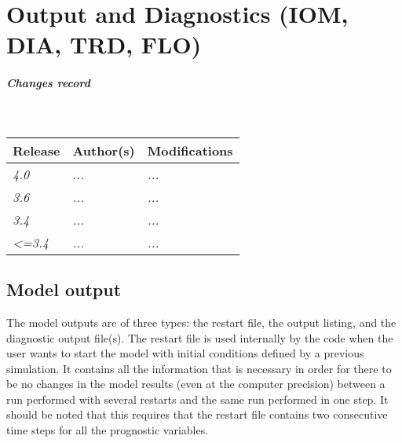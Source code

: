\documentclass[../main/NEMO_manual]{subfiles}
\begin{document}
\chapter{Output and Diagnostics (IOM, DIA, TRD, FLO)}
\label{chap:DIA}


\thispagestyle{plain}

\chaptertoc

\paragraph{Changes record} ~\\

{\footnotesize
  \begin{tabularx}{\textwidth}{l||X|X}
    Release & Author(s) & Modifications \\
    \hline
    {\em   4.0} & {\em ...} & {\em ...} \\
    {\em   3.6} & {\em ...} & {\em ...} \\
    {\em   3.4} & {\em ...} & {\em ...} \\
    {\em <=3.4} & {\em ...} & {\em ...}
  \end{tabularx}
}

\clearpage

\section{Model output}
\label{sec:DIA_io_old}

The model outputs are of three types: the restart file, the output listing, and the diagnostic output file(s).
The restart file is used internally by the code when the user wants to start the model with
initial conditions defined by a previous simulation.
It contains all the information that is necessary in order for there to be no changes in the model results
(even at the computer precision) between a run performed with several restarts and
the same run performed in one step.
It should be noted that this requires that the restart file contains two consecutive time steps for
all the prognostic variables.
\end{document}
